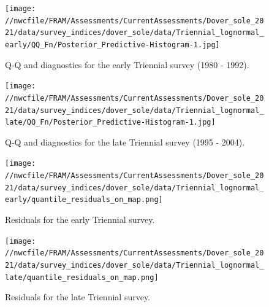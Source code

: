 \documentclass[11pt,
  english,
  a4paper,
]{article}
\begin{document}
\begin{figure}
\centering
\texttt{[image: //nwcfile/FRAM/Assessments/CurrentAssessments/Dover\_sole\_2021/data/survey\_indices/dover\_sole/data/Triennial\_lognormal\_early/QQ\_Fn/Posterior\_Predictive-Histogram-1.jpg]}
\caption{Q-Q and diagnostics for the early Triennial survey (1980 - 1992).\label{fig:tri-early-qq}}
\end{figure}

\tagmcend\tagstructend


\begin{figure}
\centering
\texttt{[image: //nwcfile/FRAM/Assessments/CurrentAssessments/Dover\_sole\_2021/data/survey\_indices/dover\_sole/data/Triennial\_lognormal\_late/QQ\_Fn/Posterior\_Predictive-Histogram-1.jpg]}
\caption{Q-Q and diagnostics for the late Triennial survey (1995 - 2004).\label{fig:tri-late-qq}}
\end{figure}

\tagmcend\tagstructend

\newpage


\begin{figure}
\centering
\texttt{[image: //nwcfile/FRAM/Assessments/CurrentAssessments/Dover\_sole\_2021/data/survey\_indices/dover\_sole/data/Triennial\_lognormal\_early/quantile\_residuals\_on\_map.png]}
\caption{Residuals for the early Triennial survey.\label{fig:tri-early-resid}}
\end{figure}

\tagmcend\tagstructend


\begin{figure}
\centering
\texttt{[image: //nwcfile/FRAM/Assessments/CurrentAssessments/Dover\_sole\_2021/data/survey\_indices/dover\_sole/data/Triennial\_lognormal\_late/quantile\_residuals\_on\_map.png]}
\caption{Residuals for the late Triennial survey.\label{fig:tri-late-resid}}
\end{figure}

\tagmcend\tagstructend

\newpage

\end{document}
